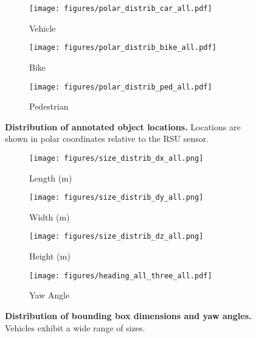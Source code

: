 \begin{figure*}[t!]
    \centering
    \begin{subfigure}{.32\textwidth}
        \centering
        \texttt{[image: figures/polar\_distrib\_car\_all.pdf]}
        \caption{Vehicle}
    \end{subfigure}
    \begin{subfigure}{.32\textwidth}
        \centering
        \texttt{[image: figures/polar\_distrib\_bike\_all.pdf]}
        \caption{Bike}
    \end{subfigure}
    \begin{subfigure}{.32\textwidth}
        \centering
        \texttt{[image: figures/polar\_distrib\_ped\_all.pdf]}
        \caption{Pedestrian}
    \end{subfigure}%
    \caption{\small \textbf{Distribution of annotated object locations.} Locations are shown in polar coordinates relative to the RSU \rsutop sensor.}
    \label{fig:percentage_each_class_in_polar_coord}
\end{figure*}



\begin{figure*}[t!]
    \centering
    \begin{subfigure}{.24\linewidth}
        \centering
        \texttt{[image: figures/size\_distrib\_dx\_all.png]}
        \caption{Length (m)}
    \end{subfigure}
    \begin{subfigure}{.24\linewidth}
        \centering
        \texttt{[image: figures/size\_distrib\_dy\_all.png]}
        \caption{Width (m)}
    \end{subfigure}
    \begin{subfigure}{.24\linewidth}
        \centering
        \texttt{[image: figures/size\_distrib\_dz\_all.png]}
        \caption{Height (m)}
    \end{subfigure}%
    \begin{subfigure}{.24\linewidth}
    \centering
    \texttt{[image: figures/heading\_all\_three\_all.pdf]}
    \caption{Yaw Angle}
    \end{subfigure}%
    \caption{\small \textbf{Distribution of bounding box dimensions and yaw angles.} Vehicles exhibit a wide range of sizes.}
    \label{fig:classes_size_distribution}
\end{figure*}



